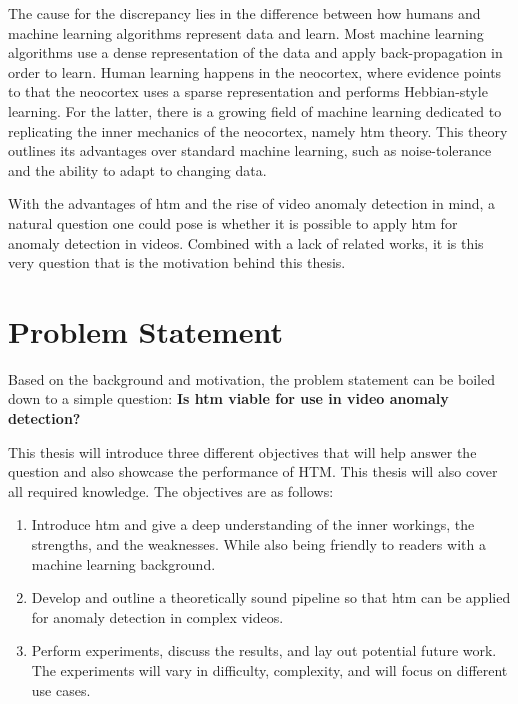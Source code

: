 \par
The cause for the discrepancy lies in the difference between how humans and machine learning algorithms represent data and learn. Most machine learning algorithms use a dense representation of the data and apply back-propagation in order to learn. Human learning happens in the neocortex, where evidence points to that the neocortex uses a sparse representation and performs Hebbian-style learning. For the latter, there is a growing field of machine learning dedicated to replicating the inner mechanics of the neocortex, namely  \gls*{htm} theory. This theory outlines its advantages over standard machine learning, such as noise-tolerance and the ability to adapt to changing data.
\par
With the advantages of  \gls*{htm} and the rise of video anomaly detection in mind, a natural question one could pose is whether it is possible to apply  \gls*{htm} for anomaly detection in videos. Combined with a lack of related works, it is this very question that is the motivation behind this thesis.

\section{Problem Statement}
\label{sec:problem_statement}
Based on the background and motivation, the problem statement can be boiled down to a simple question: \textbf{Is \gls*{htm} viable for use in video anomaly detection?}\par
This thesis will introduce three different objectives that will help answer the question and also showcase the performance of HTM. This thesis will also cover all required knowledge. The objectives are as follows:
\begin{enumerate}
    \item Introduce  \gls*{htm} and give a deep understanding of the inner workings, the strengths, and the weaknesses. While also being friendly to readers with a machine learning background.
    \item Develop and outline a theoretically sound pipeline so that  \gls*{htm} can be applied for anomaly detection in complex videos.
    \item Perform experiments, discuss the results, and lay out potential future work. The experiments will vary in difficulty, complexity, and will focus on different use cases.
\end{enumerate}

